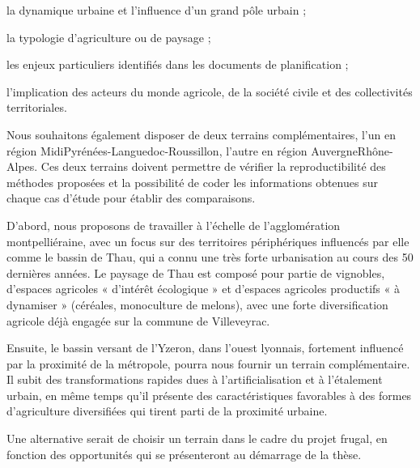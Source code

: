 \startitemize

\item la dynamique urbaine et l'influence d'un grand pôle urbain ;
\item la typologie d’agriculture ou de paysage ;
\item les enjeux particuliers identifiés dans les documents de planification ;
\item l'implication des acteurs du monde agricole, de la société civile
  et des collectivités territoriales.

\stopitemize

Nous souhaitons également disposer de deux terrains complémentaires,
l'un en région Midi\-Pyrénées-Languedoc-Roussillon, l'autre
en région Auvergne\-Rhône-Alpes. Ces deux terrains doivent permettre
de vérifier la reproductibilité des méthodes proposées
et la possibilité de coder les informations obtenues sur chaque cas d'étude
pour établir des comparaisons.

D'abord, nous proposons de travailler à l'échelle de l'agglomération montpelliéraine,
avec un focus sur des territoires périphériques influencés par elle
comme le bassin de Thau, qui a connu une très forte urbanisation
au cours des 50 dernières années. Le paysage de Thau est composé pour partie de vignobles,
d’espaces agricoles « d’intérêt écologique » et d’espaces agricoles
productifs « à dynamiser » (céréales, monoculture de melons),
avec une forte diversification agricole déjà engagée sur la commune de Villeveyrac.

Ensuite, le bassin versant de l'Yzeron, dans l'ouest lyonnais, fortement influencé par la proximité de la métropole,
pourra nous fournir un terrain complémentaire.
Il subit des transformations rapides dues à l'artificialisation et à l'étalement urbain,
en même temps qu'il présente des caractéristiques favorables à des formes d'agriculture diversifiées
qui tirent parti de la proximité urbaine.

Une alternative serait de choisir un terrain dans le cadre du projet {\sc frugal},
en fonction des opportunités qui se présenteront au démarrage de la thèse.